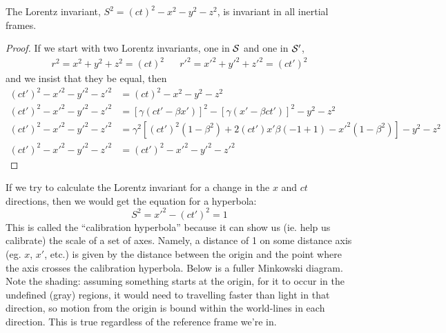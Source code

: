 \documentclass[a4paper]{article}
\begin{document}
\begin{prop}
	The Lorentz invariant,
	\(S^2 = (ct)^2-x^2-y^2-z^2\), is invariant in all inertial frames.
\end{prop}
\begin{proof}
	If we start with two Lorentz invariants, one in $\S$ and one in
	$\S'$,
	\begin{align*}
		r^2 = x^2+y^2+z^2=(ct)^2 &&
	r'^2 = x'^2+y'^2+z'^2=(ct')^2
	\end{align*}
	and we insist that they be equal, then
\begin{align*}
	(ct')^2-x'^2-y'^2-z'^2 &= (ct)^2-x^2-y^2-z^2\\
	(ct')^2-x'^2-y'^2-z'^2 &= [\gamma(ct'-\beta x')]^2
		-[\gamma(x'-\beta ct')]^2-y^2-z^2\\
	(ct')^2-x'^2-y'^2-z'^2 &= \gamma^2[(ct')^2(1-\beta^2)+
		2(ct')x'\beta(-1+1)-x'^2(1-\beta^2)] -y^2-z^2\\
	(ct')^2-x'^2-y'^2-z'^2&=(ct')^2-x'^2-y'^2-z'^2
\end{align*}
\end{proof}

If we try to calculate the Lorentz invariant for a change in the $x$ and $ct$ 
directions, then we would get the equation for a hyperbola:
\[ S^2 = x'^2 - (ct')^2 = 1 \]
This is called the ``calibration hyperbola'' because it can show us (ie.
help us calibrate) the scale of a set of axes. Namely, a distance of 1 on some
distance axis (eg. $x$, $x'$, etc.) is given by the distance between the
origin and the point where the axis crosses the calibration hyperbola.
Below is a fuller Minkowski diagram. Note the shading: assuming something
starts at the origin, for it to occur in the undefined (gray)
regions, it would need to travelling faster than light in that direction, so
motion from the origin is bound within the world-lines in each direction.
This is true regardless of the reference frame we're in.

\begin{center}                                                                  
\end{center}
\end{document}
